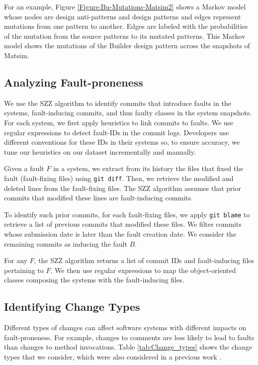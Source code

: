 For an example, Figure \ref{Figure:Bu-Mutations-Matsim2} shows a Markov model whose nodes are design anti-patterns and design patterns and edges represent mutations from one pattern to another. Edges are labeled with the probabilities of the mutation from the source patterns to its mutated patterns. This Markov model shows the mutations of the Builder design pattern across the snapshots of Matsim.



\subsection{Analyzing Fault-proneness} \label{ssec:section3.5}

We use the SZZ algorithm \cite{sliwerski2005changes} to identify commits that introduce faults in the systems, \ie{} fault-inducing commits, and thus faulty classes in the system snapshots. For each system, we first apply heuristics \cite{fischer2003populating} to link commits to faults. We use regular expressions to detect fault-IDs in the commit logs. Developers use different conventions for these IDs in their systems so, to ensure accuracy, we tune our heuristics on our dataset incrementally and manually. 

Given a fault $F$ in a system, we extract from its history the files that fixed the fault (fault-fixing files) using \texttt{git diff}. Then, we retrieve the modified and deleted lines from the fault-fixing files. The SZZ algorithm assumes that prior commits that modified these lines are fault-inducing commits. 

To identify such prior commits, for each fault-fixing files, we apply \texttt{git blame} to retrieve a list of previous commits that modified these files. We filter commits whose submission date is later than the fault creation date. We consider the remaining commits as inducing the fault $B$. 

For any $F$, the SZZ algorithm returns a list of commit IDs and fault-inducing files pertaining to $F$. We then use regular expressions to map the object-oriented classes composing the systems with the fault-inducing files.



\subsection{Identifying Change Types}
\label{ssec:section3.6}

Different types of changes can affect software systems with different impacts on fault-proneness. For example, changes to comments are less likely to lead to faults than changes to method invocations. Table \ref{tab:Change_types} shows the change types that we consider, which were also considered in a previous work \cite{an2015empirical}.

